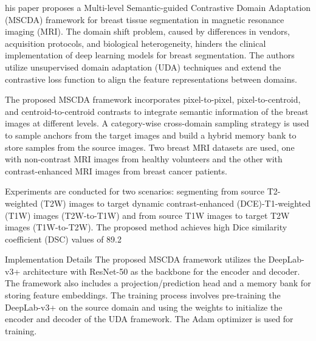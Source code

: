 \documentclass{article}
\begin{document}
his paper proposes a Multi-level Semantic-guided Contrastive Domain Adaptation (MSCDA) framework for breast tissue segmentation in magnetic resonance imaging (MRI). The domain shift problem, caused by differences in vendors, acquisition protocols, and biological heterogeneity, hinders the clinical implementation of deep learning models for breast segmentation. The authors utilize unsupervised domain adaptation (UDA) techniques and extend the contrastive loss function to align the feature representations between domains.

The proposed MSCDA framework incorporates pixel-to-pixel, pixel-to-centroid, and centroid-to-centroid contrasts to integrate semantic information of the breast images at different levels. A category-wise cross-domain sampling strategy is used to sample anchors from the target images and build a hybrid memory bank to store samples from the source images. Two breast MRI datasets are used, one with non-contrast MRI images from healthy volunteers and the other with contrast-enhanced MRI images from breast cancer patients.

Experiments are conducted for two scenarios: segmenting from source T2-weighted (T2W) images to target dynamic contrast-enhanced (DCE)-T1-weighted (T1W) images (T2W-to-T1W) and from source T1W images to target T2W images (T1W-to-T2W). The proposed method achieves high Dice similarity coefficient (DSC) values of 89.2%

Implementation Details
The proposed MSCDA framework utilizes the DeepLab-v3+ architecture with ResNet-50 as the backbone for the encoder and decoder. The framework also includes a projection/prediction head and a memory bank for storing feature embeddings. The training process involves pre-training the DeepLab-v3+ on the source domain and using the weights to initialize the encoder and decoder of the UDA framework. The Adam optimizer is used for training.
\end{document}
